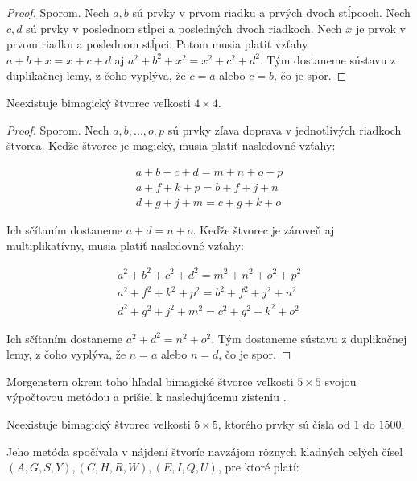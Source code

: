 \begin{proof} Sporom. Nech $a,b$ sú prvky v prvom riadku a prvých dvoch stĺpcoch. Nech $c,d$ sú prvky v poslednom stĺpci a posledných dvoch riadkoch. Nech $x$ je prvok v prvom riadku a poslednom stĺpci. Potom musia platiť vzťahy $a + b + x = x + c + d$ aj $a^2 + b^2 + x^2 = x^2 + c^2 + d^2$. Tým dostaneme sústavu z duplikačnej lemy, z čoho vyplýva, že $c = a$ alebo $c = b$, čo je spor.
\end{proof} 

\begin{theorem} Neexistuje bimagický štvorec veľkosti $4 \times 4$.
\end{theorem}

\begin{proof} Sporom. Nech $a, b, ... , o, p$ sú prvky zľava doprava v jednotlivých riadkoch štvorca. Keďže štvorec je magický, musia platiť nasledovné vzťahy:

\begin{gather}
a + b + c + d = m + n + o + p \\
a + f + k + p = b + f + j + n \\
d + g + j + m = c + g + k + o
\end{gather}

Ich sčítaním dostaneme $a + d = n + o$. Keďže štvorec je zároveň aj multiplikatívny, musia platiť nasledovné vzťahy:

\begin{gather}
a^2 + b^2 + c^2 + d^2 = m^2 + n^2 + o^2 + p^2 \\
a^2 + f^2 + k^2 + p^2 = b^2 + f^2 + j^2 + n^2 \\
d^2 + g^2 + j^2 + m^2 = c^2 + g^2 + k^2 + o^2
\end{gather}

Ich sčítaním dostaneme $a^2 + d^2 = n^2 + o^2$. Tým dostaneme sústavu z duplikačnej lemy, z čoho vyplýva, že $n = a$ alebo $n = d$, čo je spor.
\end{proof} 

Morgenstern okrem toho hľadal bimagické štvorce veľkosti $5 \times 5$ svojou výpočtovou metódou a prišiel k nasledujúcemu zisteniu \cite{multimagie}.

\begin{theorem} Neexistuje bimagický štvorec veľkosti $5 \times 5$, ktorého prvky sú čísla od $1$ do $1500$.
\end{theorem}

Jeho metóda spočívala v nájdení štvoríc navzájom rôznych kladných celých čísel $(A,G,S,Y), (C,H,R,W), (E,I,Q,U)$, pre ktoré platí:

